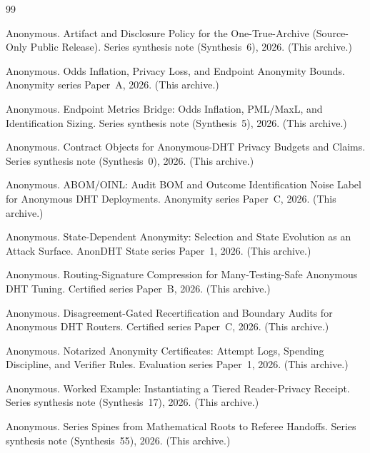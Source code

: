 \documentclass[11pt]{article}
\begin{document}
\begin{thebibliography}{99}\small

Anonymous.
\newblock Artifact and Disclosure Policy for the One-True-Archive (Source-Only Public Release).
\newblock Series synthesis note (Synthesis~6), 2026. (This archive.)

Anonymous.
\newblock Odds Inflation, Privacy Loss, and Endpoint Anonymity Bounds.
\newblock Anonymity series Paper~A, 2026. (This archive.)

Anonymous.
\newblock Endpoint Metrics Bridge: Odds Inflation, PML/MaxL, and Identification Sizing.
\newblock Series synthesis note (Synthesis~5), 2026. (This archive.)

Anonymous.
\newblock Contract Objects for Anonymous-DHT Privacy Budgets and Claims.
\newblock Series synthesis note (Synthesis~0), 2026. (This archive.)

Anonymous.
\newblock ABOM/OINL: Audit BOM and Outcome Identification Noise Label for Anonymous DHT Deployments.
\newblock Anonymity series Paper~C, 2026. (This archive.)

Anonymous.
\newblock State-Dependent Anonymity: Selection and State Evolution as an Attack Surface.
\newblock AnonDHT State series Paper~1, 2026. (This archive.)

Anonymous.
\newblock Routing-Signature Compression for Many-Testing-Safe Anonymous DHT Tuning.
\newblock Certified series Paper~B, 2026. (This archive.)

Anonymous.
\newblock Disagreement-Gated Recertification and Boundary Audits for Anonymous DHT Routers.
\newblock Certified series Paper~C, 2026. (This archive.)

Anonymous.
\newblock Notarized Anonymity Certificates: Attempt Logs, Spending Discipline, and Verifier Rules.
\newblock Evaluation series Paper~1, 2026. (This archive.)

Anonymous.
\newblock Worked Example: Instantiating a Tiered Reader-Privacy Receipt.
\newblock Series synthesis note (Synthesis~17), 2026. (This archive.)

Anonymous.
\newblock Series Spines from Mathematical Roots to Referee Handoffs.
\newblock Series synthesis note (Synthesis~55), 2026. (This archive.)


\end{thebibliography}
\end{document}
